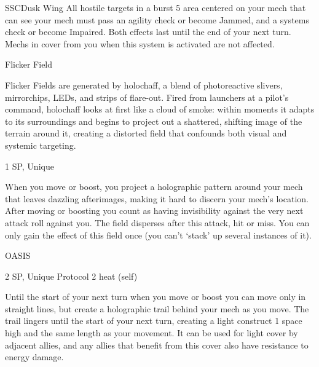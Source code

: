 \begin{mech}{SSC}{Dusk Wing}
All hostile targets in a burst 5 area centered on your mech that can see your mech must pass an agility check or become Jammed, and a systems check or become Impaired. Both effects last until the end of your next turn. Mechs in cover from you when this system is activated are not affected.


Flicker Field

Flicker Fields are generated by holochaff, a blend of photoreactive slivers, mirrorchips, LEDs, and strips of flare-out. Fired from launchers at a pilot’s command, holochaff looks at first like a cloud of smoke: within moments it adapts to its surroundings and begins to project out a shattered, shifting image of the terrain around it, creating a distorted field that confounds both visual and systemic targeting.

1 SP, Unique

When you move or boost, you project a holographic pattern around your mech that leaves dazzling afterimages, making it hard to discern your mech’s location. After moving or boosting you count as having invisibility against the very next attack roll against you. The field disperses after this attack, hit or miss. You can only gain the effect of this field once (you can’t ‘stack’ up several instances of it).


OASIS

2 SP, Unique
Protocol
2 heat (self)

Until the start of your next turn when you move or boost you can move only in straight lines, but create a holographic trail behind your mech as you move. The trail lingers until the start of your next turn, creating a light construct 1 space high and the same length as your movement. It can be used for light cover by adjacent allies, and any allies that benefit from this cover also have resistance to energy damage.

\end{mech}
